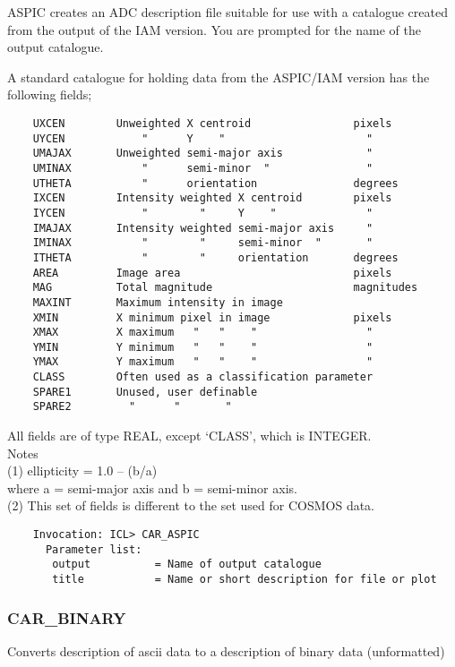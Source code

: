 ASPIC creates an ADC description file suitable for use with a
catalogue created from the output of the IAM version.
You are prompted for the name of the output catalogue.

A standard catalogue for holding data from the ASPIC/IAM version
has the following fields;
\begin{verbatim}
    UXCEN        Unweighted X centroid                pixels
    UYCEN            "      Y    "                      "
    UMAJAX       Unweighted semi-major axis             "
    UMINAX           "      semi-minor  "               "
    UTHETA           "      orientation               degrees
    IXCEN        Intensity weighted X centroid        pixels
    IYCEN            "        "     Y    "              "
    IMAJAX       Intensity weighted semi-major axis     "
    IMINAX           "        "     semi-minor  "       "
    ITHETA           "        "     orientation       degrees
    AREA         Image area                           pixels
    MAG          Total magnitude                      magnitudes
    MAXINT       Maximum intensity in image
    XMIN         X minimum pixel in image             pixels
    XMAX         X maximum   "   "    "                 "
    YMIN         Y minimum   "   "    "                 "
    YMAX         Y maximum   "   "    "                 "
    CLASS        Often used as a classification parameter
    SPARE1       Unused, user definable
    SPARE2         "      "       "
 \end{verbatim}
 All fields are of type REAL, except `CLASS', which is INTEGER.\\
 Notes\\
 (1)  ellipticity = 1.0 -- (b/a)\\
      where   a = semi-major axis and b = semi-minor axis.\\
 (2)  This set of fields is different to the set used for COSMOS data.
\begin{verbatim}
    Invocation: ICL> CAR_ASPIC
      Parameter list:
       output          = Name of output catalogue
       title           = Name or short description for file or plot
\end{verbatim}

\subsubsection{CAR\_BINARY}

Converts description of ascii data to a description of binary data (unformatted)

